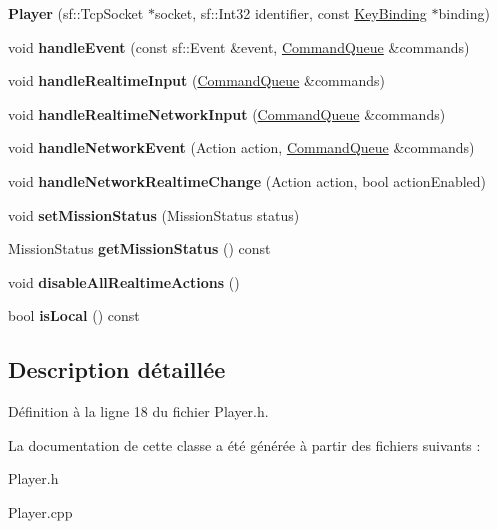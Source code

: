 \begin{DoxyCompactItemize}
\item 
\hypertarget{class_player_a8bae305bd8ae9b34f6125bdf9285f909}{}\label{class_player_a8bae305bd8ae9b34f6125bdf9285f909} 
{\bfseries Player} (sf\+::\+Tcp\+Socket $\ast$socket, sf\+::\+Int32 identifier, const \hyperlink{class_key_binding}{Key\+Binding} $\ast$binding)
\item 
\hypertarget{class_player_ac84a4e0b787f92bf773ccd0d0483f5b1}{}\label{class_player_ac84a4e0b787f92bf773ccd0d0483f5b1} 
void {\bfseries handle\+Event} (const sf\+::\+Event \&event, \hyperlink{class_command_queue}{Command\+Queue} \&commands)
\item 
\hypertarget{class_player_ac520744c103fb38763c8856b4f158627}{}\label{class_player_ac520744c103fb38763c8856b4f158627} 
void {\bfseries handle\+Realtime\+Input} (\hyperlink{class_command_queue}{Command\+Queue} \&commands)
\item 
\hypertarget{class_player_a50b5570c73003863b0207b3b023252ee}{}\label{class_player_a50b5570c73003863b0207b3b023252ee} 
void {\bfseries handle\+Realtime\+Network\+Input} (\hyperlink{class_command_queue}{Command\+Queue} \&commands)
\item 
\hypertarget{class_player_af1ddf80d1e34045a5fd8b861b9237148}{}\label{class_player_af1ddf80d1e34045a5fd8b861b9237148} 
void {\bfseries handle\+Network\+Event} (Action action, \hyperlink{class_command_queue}{Command\+Queue} \&commands)
\item 
\hypertarget{class_player_a8061d439088ed529fbde6830b4a2e44f}{}\label{class_player_a8061d439088ed529fbde6830b4a2e44f} 
void {\bfseries handle\+Network\+Realtime\+Change} (Action action, bool action\+Enabled)
\item 
\hypertarget{class_player_af05bf5f8492d79b38ef2a39cefe0ea9e}{}\label{class_player_af05bf5f8492d79b38ef2a39cefe0ea9e} 
void {\bfseries set\+Mission\+Status} (Mission\+Status status)
\item 
\hypertarget{class_player_a256eae0de57cd814b06ccb9ef3830c39}{}\label{class_player_a256eae0de57cd814b06ccb9ef3830c39} 
Mission\+Status {\bfseries get\+Mission\+Status} () const
\item 
\hypertarget{class_player_a15e1b1acf094c424d18c2a1192a151f6}{}\label{class_player_a15e1b1acf094c424d18c2a1192a151f6} 
void {\bfseries disable\+All\+Realtime\+Actions} ()
\item 
\hypertarget{class_player_a0396dba172c6d19535d573ce553e5980}{}\label{class_player_a0396dba172c6d19535d573ce553e5980} 
bool {\bfseries is\+Local} () const
\end{DoxyCompactItemize}


\subsection{Description détaillée}


Définition à la ligne 18 du fichier Player.\+h.



La documentation de cette classe a été générée à partir des fichiers suivants \+:\begin{DoxyCompactItemize}
\item 
Player.\+h\item 
Player.\+cpp\end{DoxyCompactItemize}
